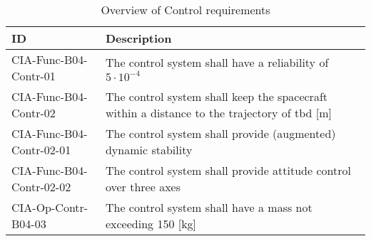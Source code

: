 \begin{table}[H]
	\caption*{Overview of Control requirements}
	\begin{tabular}{|p{}|p{}|}
		\hline
		ID         					&	Description																							\\ \hline \hline
		CIA-Func-B04-Contr-01		&	The control system shall have a reliability of $5 \cdot 10^{-4}$            									\\ \hline
		CIA-Func-B04-Contr-02 		&	The control system shall keep the spacecraft within a distance to the trajectory of \gls{tbd} [m]	\\ \hline	
		CIA-Func-B04-Contr-02-01 	&	The control system shall provide (augmented) dynamic stability       								\\ \hline
		CIA-Func-B04-Contr-02-02 	&	The control system shall provide attitude control over three axes         							\\ \hline	
		CIA-Op-Contr-B04-03	&	The control system shall have a mass not exceeding 150 [kg]  							\\ \hline
	\end{tabular}
\end{table}
